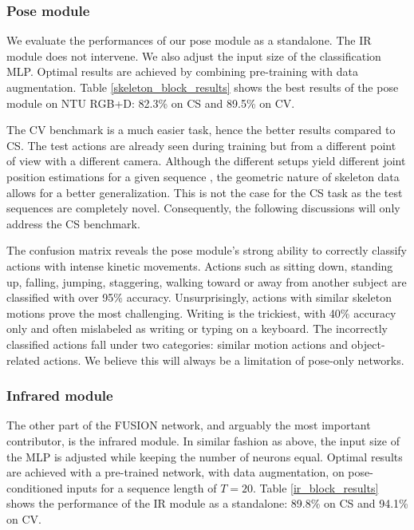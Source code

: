 \documentclass[letterpaper, 10 pt, conference]{ieeeconf}
\begin{document}
\subsubsection{Pose module}

We evaluate the performances of our pose module as a standalone. The IR module does not intervene. We also adjust the input size of the classification MLP. Optimal results are achieved by combining pre-training with data augmentation. Table \ref{skeleton_block_results} shows the best results of the pose module on NTU RGB+D: 82.3\% on CS and 89.5\% on CV. 

The CV benchmark is a much easier task, hence the better results compared to CS. The test actions are already seen during training but from a different point of view with a different camera. Although the different setups yield different joint position estimations for a given sequence \cite{zhang2019view}, the geometric nature of skeleton data allows for a better generalization. This is not the case for the CS task as the test sequences are completely novel. Consequently, the following discussions will only address the CS benchmark.

The confusion matrix reveals the pose module's strong ability to correctly classify actions with intense kinetic movements. Actions such as sitting down, standing up, falling, jumping, staggering, walking toward or away from another subject are classified with over 95\% accuracy. Unsurprisingly, actions with similar skeleton motions prove the most challenging. Writing is the trickiest, with 40\% accuracy only and often mislabeled as writing or typing on a keyboard. The incorrectly classified actions fall under two categories: similar motion actions and object-related actions. We believe this will always be a limitation of pose-only networks.

\subsubsection{Infrared module}

The other part of the FUSION network, and arguably the most important contributor, is the infrared module. In similar fashion as above, the input size of the MLP is adjusted while keeping the number of neurons equal. Optimal results are achieved with a pre-trained network, with data augmentation, on pose-conditioned inputs for a sequence length of $T=20$. Table \ref{ir_block_results} shows the performance of the IR module as a standalone: 89.8\% on CS and 94.1\% on CV. 
\end{document}
